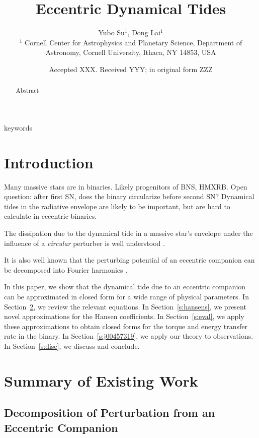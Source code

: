 \documentclass[
        fleqn,
        usenatbib,
        referee,
    ]{mnras}
\title[Eccentric Dynamical Tides]{Eccentric Dynamical Tides}
\author[Y. Su, D. Lai.]{
Yubo Su$^1$,
Dong Lai$^1$
\\
$^1$ Cornell Center for Astrophysics and Planetary Science, Department of
Astronomy, Cornell University, Ithaca, NY 14853, USA
}
\date{Accepted XXX\@. Received YYY\@; in original form ZZZ}
\begin{document}
\label{firstpage}
\pagerange{\pageref{firstpage}--\pageref{lastpage}}
\maketitle

\begin{abstract}
    Abstract
\end{abstract}

\begin{keywords}
keywords %
\end{keywords}

\section{Introduction}

Many massive stars are in binaries. Likely progenitors of BNS, HMXRB\@. Open
question: after first SN, does the binary circularize before second SN\@?
Dynamical tides in the radiative envelope are likely to be important, but are
hard to calculate in eccentric binaries.

The dissipation due to the dynamical tide in a massive star's envelope under the
influence of a \emph{circular} perturber is well understood \citep{kushnir}.

It is also well known that the perturbing potential of an eccentric companion
can be decomposed into Fourier harmonics \citep[e.g.][]{sl, vlf}.

In this paper, we show that the dynamical tide due to an eccentric companion can
be approximated in closed form for a wide range of physical parameters. In
Section~\ref{s:background}, we review the relevant equations. In
Section~\ref{s:hansens}, we present novel approximations for the Hansen
coefficients. In Section~\ref{s:eval}, we apply these approximations to obtain
closed forms for the torque and energy transfer rate in the binary. In
Section~\ref{s:j00457319}, we apply our theory to observations. In
Section~\ref{s:disc}, we discuss and conclude.

\section{Summary of Existing Work}\label{s:background}

\subsection{Decomposition of Perturbation from an Eccentric Companion}
\end{document}
